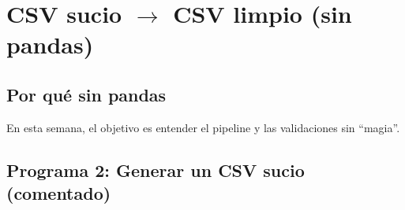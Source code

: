 \documentclass[11pt, a4paper]{article}
\begin{document}
\newpage

\section{CSV sucio \texorpdfstring{\(\rightarrow\)}{->} CSV limpio (sin pandas)}
\subsection{Por qué sin pandas}
En esta semana, el objetivo es entender el pipeline y las validaciones sin ``magia''.

\subsection{Programa 2: Generar un CSV sucio (comentado)}
\end{document}
